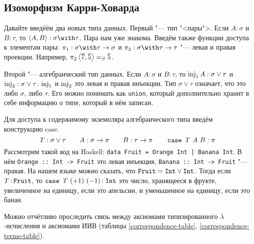 \subsection{\texorpdfstring{Изоморфизм Карри-Ховарда}{Curry-Howard correspondence}}

Давайте введёём два новых типа данных.
Первый "--- тип "<пары">. Если $A : \sigma$ и $B : \tau$, то $\pair{A}{B} : \sigma \with \tau$. Пара нам уже знакома.
Введём также функции доступа к элементам пары: $\pi_1 : \sigma\with\tau\rightarrow\sigma$ и $\pi_2 : \sigma\with\tau\rightarrow\tau$
"--- левая и правая проекции.
Например, $\pi_2 \left<\overline 7,\overline 5\right> =_\beta \overline 5$.

Второй "--- алгебраический тип данных. Если $A : \sigma$ и $B : \tau$, то $\operatorname{inj}_1 A : \sigma \vee \tau$ и $\operatorname{inj}_2 : \sigma \vee \tau$.
$\operatorname{inj}_1$ и $\operatorname{inj}_2$ это левая и правая инъекции.
Тип $\sigma \vee \tau$ означает, что это либо $\sigma$, либо $\tau$.
Его можно понимать как \texttt{union}, который дополнительно хранит в себе информацию о типе, который в нём записан.

Для доступа к содержимому экземпляра алгебраического типа введём конструкцию case.
\[
T : \sigma \vee \tau \qquad A : \sigma \rightarrow \pi \qquad B : \tau \rightarrow \pi \qquad \mathinner{\mathtt{case}}~T~A~B : \pi
\]
Рассмотрим такой код на Haskell: \texttt{data Fruit = Orange Int | Banana Int}.
В нём \texttt{Orange :: Int -> Fruit} это левая инъекция, \texttt{Banana :: Int -> Fruit} "--- правая.
На нашем языке можно сказать, что $\mathinner\mathtt{Fruit} = \mathinner{\mathtt{Int}} \vee \mathinner{\mathtt{Int}}$.
Тогда если $T \mathinner{:} \mathtt{Fruit}$, то $\mathinner{\mathtt{case}}~T~(+1)~(-1) \mathinner{:} \mathrel{\mathtt{Int}}$ это число,
хранящееся в фрукте, увеличенное на единицу, если это апельсин, и уменьшенное на единицу, если это банан.

Можно отчётливо проследить связь между аксиомами типизированного $\lambda$-исчисления и аксиомами ИИВ
(таблицы \ref{correspondence-table}, \ref{correspondence-terms-table}).


